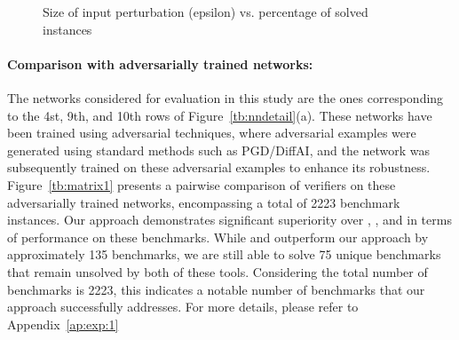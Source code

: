 \begin{figure}[t]    \centering
\scalebox{0.8}{
  
  }
    \caption{Size of input perturbation (epsilon) vs. percentage of solved instances}
    \label{res:ep:milp_with_milp}
\end{figure}


\paragraph{Comparison with adversarially trained networks: }
The networks considered for evaluation in this study are the ones corresponding to the 4st, 9th, and 10th 
rows of Figure~\ref{tb:nndetail}(a). These networks have been trained using adversarial techniques, 
where adversarial examples were generated using standard methods such as PGD/DiffAI, and the network was subsequently 
trained on these adversarial examples to enhance its robustness. Figure~\ref{tb:matrix1} presents a 
pairwise comparison of verifiers on these adversarially trained networks, 
encompassing a total of 2223 benchmark instances. 
Our approach demonstrates significant superiority over \deeppoly{}, \kpoly{}, and \deepsrgr{} in terms of 
performance on these benchmarks. While \alphabeta{} and \ovaltool{} outperform our approach by approximately 
135 benchmarks, we are still able to solve 75 unique benchmarks that remain unsolved by both of these tools. 
Considering the total number of benchmarks is 2223, this indicates a notable number of benchmarks that our 
approach successfully addresses. For more details, please refer to Appendix~\ref{ap:exp:1}


